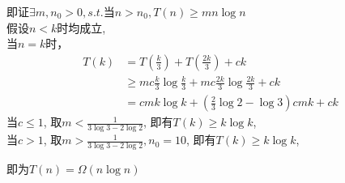 \documentclass{article}
\begin{document}
即证\(\exists m,n_{0} > 0,s.t.当n > n_{0},T(n) \geq mn\log n\)\\
假设\(n < k\)时均成立,\\
当\(n = k\)时，\\
\[\begin{aligned}
T(k) & = T\left( \frac{k}{3} \right) + T\left( \frac{2k}{3} \right) + ck \\
 & \geq mc\frac{k}{3}\log\frac{k}{3} + mc\frac{2k}{3}\log\frac{2k}{3} + ck \\
 & = cmk\log k + \left( \frac{2}{3}\log 2 - \log 3 \right)cmk + ck
\end{aligned}\] 当\(c \leq 1\), 取\(m < \frac{1}{3\log 3 - 2\log 2}\),
即有\(T(k) \geq k\log k\),\\
当\(c > 1\), 取\(m > \frac{1}{3\log 3 - 2\log 2},n_{0} = 10\),
即有\(T(k) \geq k\log k\),

即为\(T(n) = \Omega(n\log n)\)\\
\end{document}
